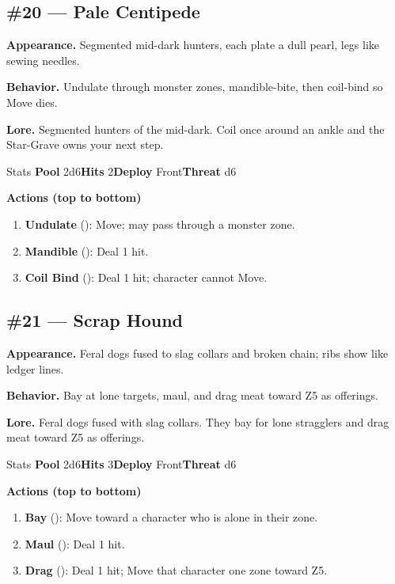 \subsection*{\#20 --- Pale Centipede}

\textbf{Appearance.} Segmented mid-dark hunters, each plate a dull pearl, legs like sewing needles.

\textbf{Behavior.} Undulate through monster zones, mandible-bite, then coil-bind so Move dies.

\textbf{Lore.} Segmented hunters of the mid-dark. Coil once around an ankle and the Star-Grave owns your next step.

\begin{monsterentry}{Stats}
\textbf{Pool} 2d6\quad\textbf{Hits} 2\quad\textbf{Deploy} Front\quad\textbf{Threat} d6

\textbf{Actions (top to bottom)}
\begin{enumerate}\setlength{\itemsep}{0.15em}\setlength{\parskip}{0pt}
  \item \textbf{Undulate} (\easy): Move; may pass through a monster zone.
  \item \textbf{Mandible} (\medium): Deal 1 hit.
  \item \textbf{Coil Bind} (\hard): Deal 1 hit; character cannot Move.
\end{enumerate}
\end{monsterentry}

\subsection*{\#21 --- Scrap Hound}

\textbf{Appearance.} Feral dogs fused to slag collars and broken chain; ribs show like ledger lines.

\textbf{Behavior.} Bay at lone targets, maul, and drag meat toward Z5 as offerings.

\textbf{Lore.} Feral dogs fused with slag collars. They bay for lone stragglers and drag meat toward Z5 as offerings.

\begin{monsterentry}{Stats}
\textbf{Pool} 2d6\quad\textbf{Hits} 3\quad\textbf{Deploy} Front\quad\textbf{Threat} d6

\textbf{Actions (top to bottom)}
\begin{enumerate}\setlength{\itemsep}{0.15em}\setlength{\parskip}{0pt}
  \item \textbf{Bay} (\easy): Move toward a character who is alone in their zone.
  \item \textbf{Maul} (\medium): Deal 1 hit.
  \item \textbf{Drag} (\hard): Deal 1 hit; Move that character one zone toward Z5.
\end{enumerate}
\end{monsterentry}

